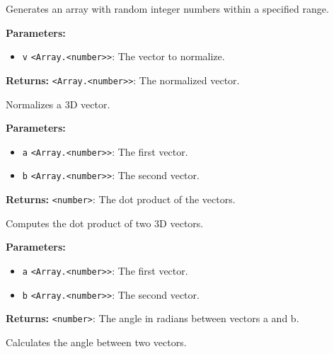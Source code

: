 \documentclass[12pt,a4paper]{article}
\begin{document}
\noindent Generates an array with random integer numbers within a specified range.

\vspace{5mm}
\noindent {}


\noindent \textbf{Parameters:}
\begin{itemize}
  \item \texttt{v} \texttt{<Array.<number>>}: The vector to normalize.
\end{itemize}

\noindent \textbf{Returns:} \texttt{<Array.<number>>}: The normalized vector.

\noindent Normalizes a 3D vector.

\vspace{5mm}
\noindent {}


\noindent \textbf{Parameters:}
\begin{itemize}
  \item \texttt{a} \texttt{<Array.<number>>}: The first vector.
  \item \texttt{b} \texttt{<Array.<number>>}: The second vector.
\end{itemize}

\noindent \textbf{Returns:} \texttt{<number>}: The dot product of the vectors.

\noindent Computes the dot product of two 3D vectors.

\vspace{5mm}
\noindent {}


\noindent \textbf{Parameters:}
\begin{itemize}
  \item \texttt{a} \texttt{<Array.<number>>}: The first vector.
  \item \texttt{b} \texttt{<Array.<number>>}: The second vector.
\end{itemize}

\noindent \textbf{Returns:} \texttt{<number>}: The angle in radians between vectors a and b.

\noindent Calculates the angle between two vectors.
\end{document}
